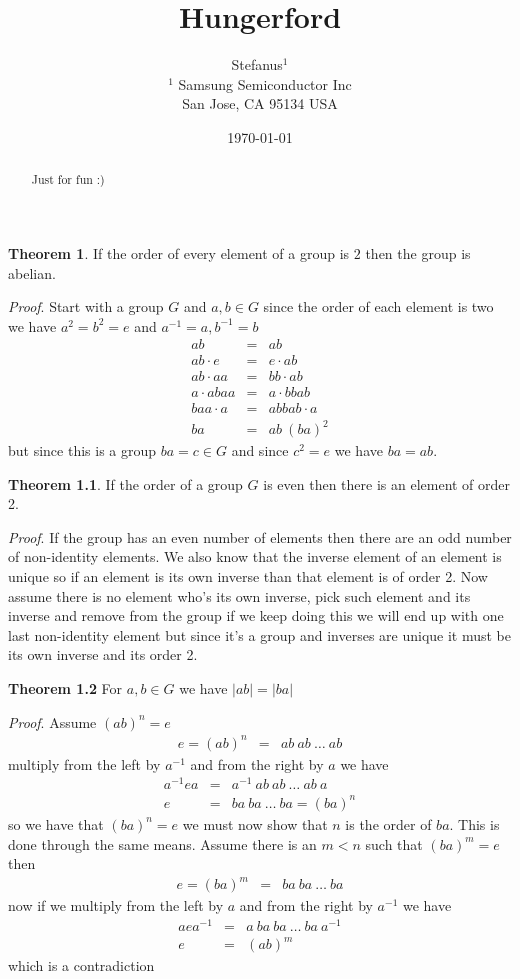 \documentclass[aps,preprint,preprintnumbers,nofootinbib,showpacs,prd]{revtex4-1}
\newcommand{\nbea}{\begin{eqnarray*}}
\newcommand{\neea}{\end{eqnarray*}}
\begin{document}
\title{Hungerford}
\bigskip
\author{Stefanus$^1$\\
$^1$ Samsung Semiconductor Inc\\ San Jose, CA 95134 USA\\
}
%
\date{\today}
%
\begin{abstract}
Just for fun :)

\end{abstract}
%
\maketitle

\renewcommand{\theequation}{A.\arabic{equation}}  %
\setcounter{equation}{0}  %



{\bf Theorem 1}. If the order of every element of a group is $2$ then the group is abelian.

{\it Proof}. Start with a group $G$ and $a,b \in G$ since the order of each element is two we have $a^2 = b^2 = e$ and $a^{-1} = a, b^{-1} = b$
%
\nbea
ab & = & ab \\
ab \cdot e & = & e \cdot ab \\
ab \cdot aa& = & bb \cdot ab \\
a\cdot abaa & = & a\cdot b bab \\
ba a\cdot a & = & ab bab \cdot a \\
ba & = & ab ~ (ba)^2
\neea
%
but since this is a group $ba = c \in G$ and since $c^2 = e$ we have $ba = ab$.

{\bf Theorem 1.1}. If the order of a group $G$ is even then there is an element of order 2.

{\it Proof}. If the group has an even number of elements then there are an odd number of non-identity elements. We also know that the inverse element of an element is unique so if an element is its own inverse than that element is of order 2. Now assume there is no element who's its own inverse, pick such element and its inverse and remove from the group if we keep doing this we will end up with one last non-identity element but since it's a group and inverses are unique it must be its own inverse and its order 2.

{\bf Theorem 1.2} For $a,b \in G$ we have $|ab| = |ba|$

{\it Proof}. Assume $(ab)^n = e$ 
%
\nbea
e = (ab)^n & = & ab~ab~\dots ~ab
\neea
%
multiply from the left by $a^{-1}$ and from the right by $a$ we have 
%
\nbea
a^{-1} e a & = & a^{-1}~ab~ab~\dots ~ab~a \\
e & = & ba ~ ba ~ \dots ~ ba = (ba)^n
\neea
%
so we have that $(ba)^n = e$ we must now show that $n$ is the order of $ba$. This is done through the same means. Assume there is an $m < n$ such that $(ba)^m = e$ then 
%
\nbea
e  = (ba)^m & = & ba ~ ba ~ \dots ~ ba
\neea
%
now if we multiply from the left by $a$ and from the right by $a^{-1}$ we have 
%
\nbea
a e a^{-1}  & = & a~ba ~ ba ~ \dots ~ ba~a^{-1} \\
e & = & (ab)^m
\neea
%
which is a contradiction
\end{document}
